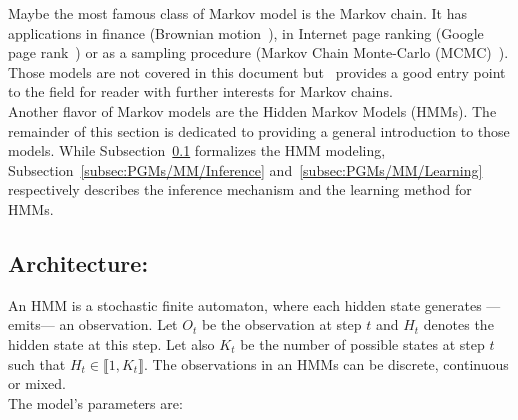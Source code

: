 \documentclass[a4paper,11pt]{report}
\begin{document}
    Maybe the most famous class of Markov model is the Markov chain. It has applications in finance (Brownian motion~\citep{duncan2000stochastic}), in Internet page ranking (Google page rank~\citep{haveliwala2003second}) or as a sampling procedure (Markov Chain Monte-Carlo (MCMC)~\citep{gilks2005markov}). Those models are not covered in this document but~\citep{kemeny1960finite} provides a good entry point to the field for reader with further interests for Markov chains.\\
    
    Another flavor of Markov models are the Hidden Markov Models (HMMs). The remainder of this section is dedicated to providing a general introduction to those models. While Subsection~\ref{subsec:PGMs/MM/Architecture} formalizes the HMM modeling, Subsection~\ref{subsec:PGMs/MM/Inference} and~\ref{subsec:PGMs/MM/Learning} respectively describes the inference mechanism and the learning method for HMMs.    
    
    \subsection{Architecture:}
      \label{subsec:PGMs/MM/Architecture}
      
      An HMM is a stochastic finite automaton, where each hidden state generates ---\ie emits--- an observation. Let $O_{t}$ be the observation at step $t$ and $H_{t}$ denotes the hidden state at this step. Let also $K_{t}$ be the number of possible states at step $t$ such that $H_{t} \in \llbracket 1, K_{t} \rrbracket$. The observations in an HMMs can be discrete, continuous or mixed.\\
      
      The model's parameters are:\\ 
      
\end{document}
